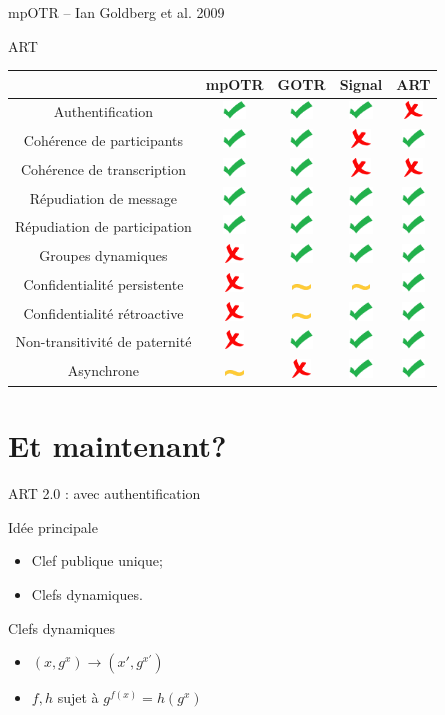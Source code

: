 \documentclass{beamer}
\newcommand{\okay}{\includegraphics[height=0.5cm]{img/check.png}}
\newcommand{\nope}{\includegraphics[height=0.5cm]{img/cross.png}}
\newcommand{\sortof}{\includegraphics[width=0.5cm]{img/tilde.png}}
\newcommand{\ra}{\rightarrow}
\begin{document}
\begin{frame}{mpOTR – Ian Goldberg et al. 2009~\cite{mpotr}}
\begin{frame}{ART}
	\center
  	\begin{tabular}{c|cccc}
			                              & mpOTR   & GOTR    & Signal  & ART   \\
			\hline
  		Authentification              & \okay   & \okay   & \okay   & \nope \\
  		\hline
  		Cohérence de participants     & \okay   & \okay   & \nope   & \okay \\
  		Cohérence de transcription    & \okay   & \okay   & \nope   & \nope \\
  		\hline
  		Répudiation de message        & \okay   & \okay   & \okay   & \okay \\
  		Répudiation de participation  & \okay   & \okay   & \okay   & \okay \\
  		\hline
  		Groupes dynamiques            & \nope   & \okay   & \okay   & \okay \\
  		\hline
  		Confidentialité persistente   & \nope   & \sortof & \sortof & \okay \\
  		Confidentialité rétroactive   & \nope   & \sortof & \okay   & \okay \\
  		Non-transitivité de paternité & \nope   & \okay   & \okay   & \okay \\
  		\hline
  		Asynchrone                    & \sortof & \nope   & \okay   & \okay
    \end{tabular}
\end{frame}

\section{Et maintenant?}
\begin{frame}{ART 2.0 : avec authentification}
	\begin{block}{Idée principale}
		\begin{itemize}
			\item Clef publique unique;
			\item Clefs dynamiques.
		\end{itemize}
	\end{block}
	\pause
	\begin{block}{Clefs dynamiques}
		\begin{itemize}
			\item $(x, g^x) \ra (x', g^{x'})$
			\item $f, h$ sujet à $g^{f(x)} = h(g^x)$
		\end{itemize}
	\end{block}
\end{frame}


\end{frame}
\end{document}
